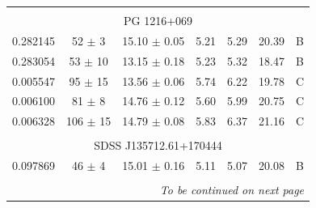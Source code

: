 \begin{table}[!h]
\begin{tabular}{ccccccc}
            \hline \tabularnewline

            \multicolumn{7}{c}{PG 1216+069} \\ \hline 

            0.282145  &  52 $\pm$ 3  &  15.10 $\pm$ 0.05  &  5.21  &  5.29  &  20.39  &  B \\
            0.283054  &  53 $\pm$ 10  &  13.15 $\pm$ 0.18  &  5.23  &  5.32  &  18.47  &  B \\
            0.005547  &  95 $\pm$ 15  &  13.56 $\pm$ 0.06  &  5.74  &  6.22  &  19.78  &  C \\
            0.006100  &  81 $\pm$ 8  &  14.76 $\pm$ 0.12  &  5.60  &  5.99  &  20.75  &  C \\
            0.006328  &  106 $\pm$ 15  &  14.79 $\pm$ 0.08  &  5.83  &  6.37  &  21.16  &  C \\

            \hline \tabularnewline

            \multicolumn{7}{c}{SDSS J135712.61+170444} \\ \hline 

            0.097869  &  46 $\pm$ 4  &  15.01 $\pm$ 0.16  &  5.11  &  5.07  &  20.08  &  B \\

            \hline \tabularnewline

            \hline \hline
            \multicolumn{7}{r}{\footnotesize{\emph{To be continued on next page}}}
        \end{tabular}
    

\end{table}


